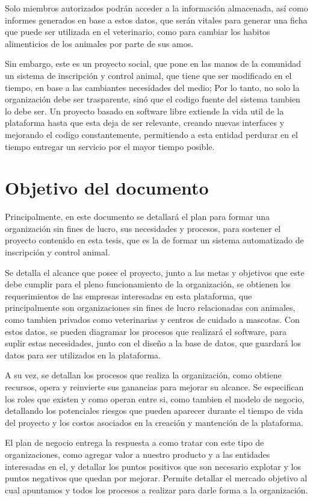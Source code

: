 \documentclass[letterpaper,openright,10pt,oneside]{report}
\begin{document}
	Solo miembros autorizados podrán acceder a la información almacenada, así como informes generados en base a estos datos, que serán vitales para generar una ficha que puede ser utilizada en el veterinario, como para cambiar los habitos alimenticios de los animales por parte de sus amos.
	
	Sin embargo, este es un proyecto social, que pone en las manos de la comunidad un sistema de inscripción y control animal, que tiene que ser modificado en el tiempo, en base a las cambiantes necesidades del medio; Por lo tanto, no solo la organización debe ser trasparente, sinó que el codigo fuente del sistema tambien lo debe ser. Un proyecto basado en software libre extiende la vida util de la plataforma hasta que esta deja de ser relevante, creando nuevas interfaces y mejorando el codigo constantemente, permitiendo a esta entidad perdurar en el tiempo entregar un servicio por el mayor tiempo posible.
	
	\chapter*{Objetivo del documento}
	Principalmente, en este documento se detallará el plan para formar una organización sin fines de lucro, sus necesidades y procesos, para sostener el proyecto contenido en esta tesis, que es la de formar un sistema automatizado de inscripción y control animal.
	
	Se detalla el alcance que posee el proyecto, junto a las metas y objetivos que este debe cumplir para el pleno funcionamiento de la organización, se obtienen los requerimientos de las empresas interesadas en esta plataforma, que principalmente son organizaciones sin fines de lucro relacionadas con animales, como tambien privados como veterinarias y centros de cuidado a mascotas. Con estos datos, se pueden diagramar los procesos que realizará el software, para suplir estas necesidades, junto con el diseño a la base de datos, que guardará los datos para ser utilizados en la plataforma.
	
	A su vez, se detallan los procesos que realiza la organización, como obtiene recursos, opera y reinvierte sus ganancias para mejorar su alcance. Se especifican los roles que existen y como operan entre si, como tambien el modelo de negocio, detallando los potenciales riesgos que pueden aparecer durante el tiempo de vida del proyecto y los costos asociados en la creación y mantención de la plataforma.
	
	
	El plan de negocio entrega la respuesta a como tratar con este tipo de organizaciones, como agregar valor a nuestro producto y a las entidades interesadas en el, y detallar los puntos positivos que son necesario explotar y los puntos negativos que quedan por mejorar. Permite detallar el mercado objetivo al cual apuntamos y todos los procesos a realizar para darle forma a la organización.
	
\end{document}
